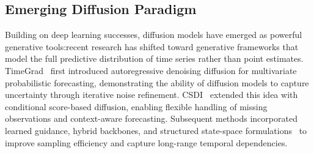\subsection{Emerging Diffusion Paradigm}
Building on deep learning successes, diffusion models have emerged as powerful generative tools:recent research has shifted toward generative frameworks that model the full predictive distribution of time series rather than point estimates. TimeGrad~\cite{2021Autoregressive} first introduced autoregressive denoising diffusion for multivariate probabilistic forecasting, demonstrating the ability of diffusion models to capture uncertainty through iterative noise refinement. CSDI~\cite{2021CSDI} extended this idea with conditional score-based diffusion, enabling flexible handling of missing observations and context-aware forecasting. Subsequent methods incorporated learned guidance, hybrid backbones, and structured state-space formulations~\cite{alcaraz2022diffusion,naiman_utilizing_nodate} to improve sampling efficiency and capture long-range temporal dependencies.

